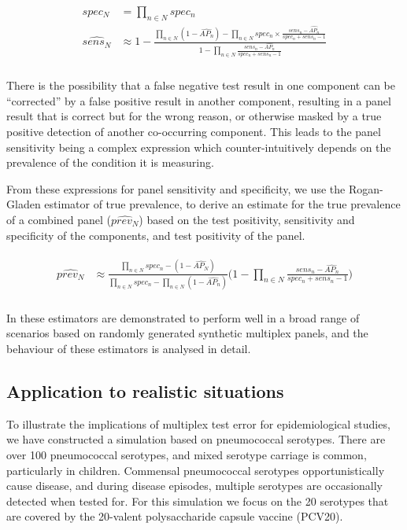 \documentclass[10pt,letterpaper]{article}
\begin{document}
\begin{eqnarray}
\label{eq:schemeP1}
\begin{aligned}
spec_N &= \prod_{n \in N}{spec_n} \\
\widehat{sens_N} &\approx 1-\frac{
  \prod_{n \in N}{(1-\widehat{AP_n})} - \prod_{n \in N}{spec_n \times \frac{sens_n-\widehat{AP_n}}{spec_n + sens_n - 1}}
}{
  1 - \prod_{n \in N}{ \frac{sens_n-\widehat{AP_n}}{spec_n + sens_n - 1} }
} \\
\end{aligned}
\end{eqnarray}

There is the possibility that a false negative test result in one component can be ``corrected'' by a false positive result in another component, resulting in a panel result that is correct but for the wrong reason, or otherwise masked by a true positive detection of another co-occurring component. This leads to the panel sensitivity being a complex expression which counter-intuitively depends on the prevalence of the condition it is measuring.

From these expressions for panel sensitivity and specificity, we use the Rogan-Gladen estimator of true prevalence\cite{rogan1978}, to derive an estimate for the true prevalence of a combined panel (\(\widehat{prev_N}\)) based on the test positivity, sensitivity and specificity of the components, and test positivity of the panel.

\begin{eqnarray}
\label{eq:schemeP2}
\begin{aligned}
\widehat{prev_{N}} &\approx \frac{
    \prod_{n \in N}{spec_n} -(1-\widehat{AP_{N}})
  }{
    \prod_{n \in N}{spec_n}
    -\prod_{n \in N}{(1-\widehat{AP_n})}
  } \bigg(1 - \prod_{n \in N}{ \frac{sens_n-\widehat{AP_n}}{spec_n + sens_n - 1} } \bigg ) \\
\end{aligned}
\end{eqnarray}

In  these estimators are demonstrated to perform well in a broad range of scenarios based on randomly generated synthetic multiplex panels, and the behaviour of these estimators is analysed in detail.

\subsection*{Application to realistic situations}

To illustrate the implications of multiplex test error for epidemiological studies, we have constructed a simulation based on pneumococcal serotypes. There are over 100 pneumococcal serotypes, and mixed serotype carriage is common, particularly in children. Commensal pneumococcal serotypes opportunistically cause disease, and during disease episodes, multiple serotypes are occasionally detected when tested for. For this simulation we focus on the 20 serotypes that are covered by the 20-valent polysaccharide capsule vaccine (PCV20).
\end{document}

